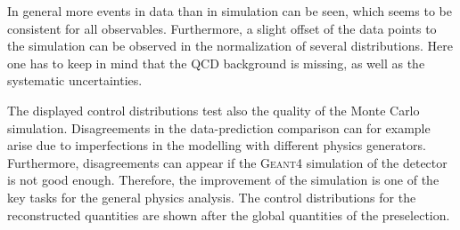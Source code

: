 In general more events in data than in simulation can be seen, which seems to be consistent for all observables. Furthermore, a slight offset of the data points to the simulation can be observed in the normalization of several distributions.    
Here one has to keep in mind that the QCD background is missing, as well as the systematic uncertainties.


The displayed control distributions test also the quality of the Monte Carlo simulation.
Disagreements in the data-prediction comparison can for example  arise due to imperfections in the  modelling  with different physics generators. Furthermore, disagreements can appear if the \textsc{Geant4} simulation of the detector is not good enough. Therefore, the improvement of the simulation is one of the key tasks for the general physics analysis. 
The control distributions for the reconstructed quantities are shown after the global quantities of the preselection.





\clearpage

